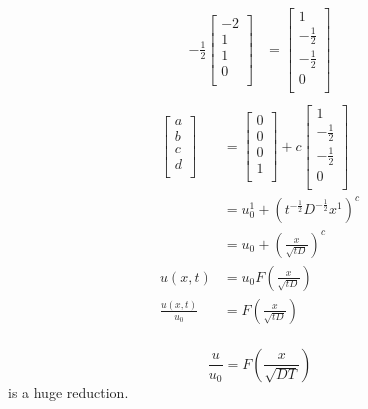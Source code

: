 \documentclass[
	date={September 4{,} 2024}
]{math486notes}
\begin{document}
\begin{equation*}
\begin{aligned}
	-\frac{1}{2}\left[ \begin{array}{c}
		-2\\
		1\\
		1\\
		0\\
	\end{array} \right]
	&= \left[ \begin{array}{c}
		1\\
		-\frac{1}{2}\\
		-\frac{1}{2}\\
		0\\
	\end{array} \right]\\
\end{aligned}
\end{equation*}
\begin{equation*}
\begin{aligned}
	\left[ \begin{array}{c}
		a\\
		b\\
		c\\
		d\\
	\end{array} \right]
	&= \left[ \begin{array}{c}
		0\\
		0\\
		0\\
		1\\
	\end{array} \right]
	+ c\left[ \begin{array}{c}
		1\\
		-\frac{1}{2}\\
		-\frac{1}{2}\\
		0\\
	\end{array} \right]\\
	&= u_{0}^{1} + \left( t^{-\frac{1}{2}}D^{-\frac{1}{2}}x^{1} \right)^{c}\\
	&= u_{0} + \left( \frac{x}{\sqrt{tD}} \right)^{c}\\
	u(x,t) &= u_{0}F\left( \frac{x}{\sqrt{tD}} \right)\\
	\frac{u(x,t)}{u_{0}} &= F\left( \frac{x}{\sqrt{tD}} \right)\\
\end{aligned}
\end{equation*}

\[ \frac{u}{u_{0}} = F\left( \frac{x}{\sqrt{DT}} \right) \]
is a huge reduction.
\end{document}

